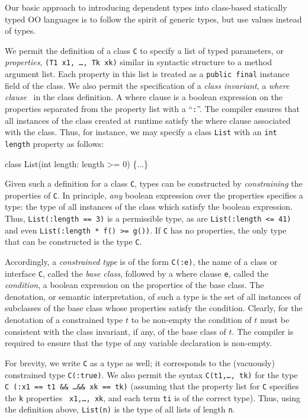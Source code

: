 Our basic approach to introducing dependent types into
class-based statically typed OO languages is to
follow the spirit of generic types, but use values instead of
types.

We permit the definition of a class {\tt C} to specify
a list of typed parameters, or {\em properties},
{\tt (T1 x1, \ldots, Tk xk)} similar in syntactic structure to
a method argument list. Each
property in this list is treated as a {\tt public final} instance
field of the class.
We also permit the
specification of a {\em class invariant}, a
{\em where clause}~\cite{where-clauses}
in the class definition. A where
clause is a boolean expression on the properties separated from the
property list with a ``{\tt :}''.  The compiler ensures that all
instances of the class created at runtime satisfy the where clause
associated with the class.
Thus, for instance, we may specify a class {\tt List} with an
{\tt int length} property as follows:
\begin{code}
  class List(int length: length >= 0) \{...\}
\end{code}

Given such a definition for a class {\tt C},
types can be constructed by {\em constraining} the properties of
{\tt C}.
In principle, {\em any} boolean expression over the
properties specifies a type: the type of all instances of the
class which satisfy the boolean expression. Thus,
{\tt List(:length == 3)} is a permissible type, as are
{\tt List(:length <= 41)} and even
{\tt List(:length * f() >= g())}.
If {\tt C} has no properties, the only type that can be
constructed is the type {\tt C}.

Accordingly, a {\em constrained type} is of the form {\tt C(:e)}, the name of
a class or interface {\tt C}, called the {\em base class}, followed by a
where clause {\tt e}, called the {\em condition}, a boolean expression
on the properties of the base class. 
The denotation, or
semantic interpretation, of such a type is the set of all instances
of subclasses of the base class whose properties satisfy the
condition.
Clearly, for the denotation of a constrained type $t$ to be
non-empty the condition of $t$ must be consistent with the class
invariant, if any, of the base class of $t$.  The compiler is required to
ensure that the type of any variable declaration is non-empty.

For brevity, we write {\tt C} as a type as well; it
corresponds to the (vacuously) constrained type {\tt C(:true)}.
We also permit the syntax {\tt C(t1,\ldots, tk)} for
the type {\tt C (:x1 == t1 \&\& \ldots \&\& xk == tk)} (assuming that
the property list for {\tt C} specifies the {\tt k} properties {\tt
x1,\ldots, xk}, and each term {\tt ti} is of the correct
type). Thus, using the definition above, {\tt List(n)} is the type of
all lists of length {\tt n}.

